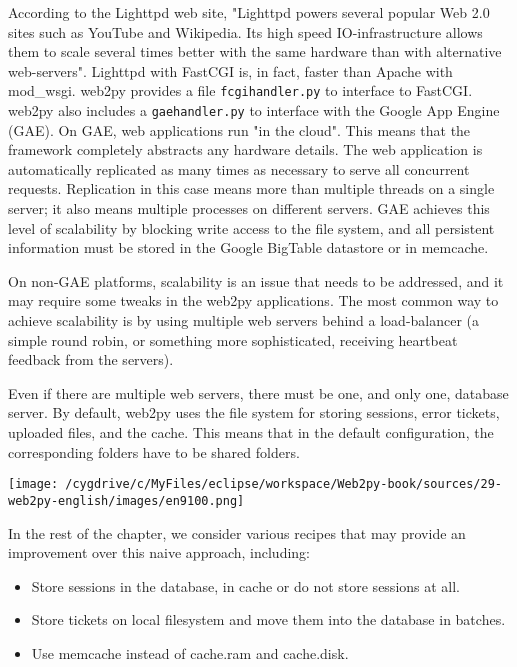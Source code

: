 \documentclass[justified,sixbynine,notoc]{tufte-book}
\def\ft{\small\tt}
\begin{document}
\begin{fullwidth}
According to the Lighttpd web site, "Lighttpd powers several popular Web 2.0 sites such as YouTube and Wikipedia. Its high speed IO-infrastructure allows them to scale several times better with the same hardware than with alternative web-servers". Lighttpd with FastCGI is, in fact, faster than Apache with mod\_wsgi.
\noindent web2py provides a file {\ft fcgihandler.py} to interface to FastCGI.
\noindent web2py also includes a {\ft gaehandler.py} to interface with the
Google App Engine (GAE). On GAE, web applications run "in the cloud". This means that the framework completely abstracts any hardware details. The web application is automatically replicated as many times as necessary to serve all concurrent requests. Replication in this case means more than multiple threads on a single server; it also means multiple processes on different servers. GAE achieves this level of scalability by blocking write access to the file system, and all persistent information must be stored in the Google BigTable datastore or in memcache.

On non-GAE platforms, scalability is an issue that needs to be addressed, and it may require some tweaks in the web2py applications. The most common way to achieve scalability is by using multiple web servers behind a load-balancer (a simple round robin, or something more sophisticated, receiving heartbeat feedback from the servers).

Even if there are multiple web servers, there must be one, and only one, database server. By default, web2py uses the file system for storing sessions, error tickets, uploaded files, and the cache. This means that in the default configuration, the corresponding folders have to be shared folders.


\goodbreak\begin{center}\texttt{[image: /cygdrive/c/MyFiles/eclipse/workspace/Web2py-book/sources/29-web2py-english/images/en9100.png]}\end{center}


In the rest of the chapter, we consider various recipes that may provide an improvement over this naive approach, including:
\begin{itemize}
\item Store sessions in the database, in cache or do not store sessions at all.

\item Store tickets on local filesystem and move them into the database in batches.

\item Use memcache instead of cache.ram and cache.disk.


\end{itemize}
\end{fullwidth}
\end{document}
